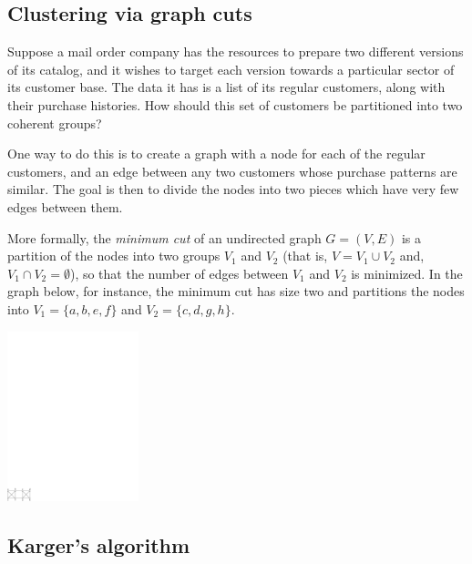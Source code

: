\documentclass{report}
\theoremstyle{plain}
\theoremstyle{definition}
\begin{document}
\lecturer{}
\scribe{}

\maketitle

\subsection{Clustering via graph cuts}

Suppose a mail order company has the resources to prepare two different versions of 
its catalog, and it wishes to target each version towards a particular sector of its 
customer base. The data it has is a list of its regular customers, along with their 
purchase histories. How should this set of customers be partitioned into two coherent 
groups?

One way to do this is to create a graph with a node for each of the regular customers,
and an edge between any two customers whose purchase patterns are similar. The goal is
then to divide the nodes into two pieces which have very few edges between them.

More formally, the {\it minimum cut} of an undirected graph $G = (V,E)$ is a partition
of the nodes into two groups $V_1$ and $V_2$ (that is, $V = V_1 \cup V_2$ and, 
$V_1 \cap V_2 = \emptyset$), so that the number of edges between $V_1$ and $V_2$ is
minimized. In the graph below, for instance, the minimum cut has size two and partitions
the nodes into $V_1 = \{a,b,e,f\}$ and $V_2 = \{c,d,g,h\}$.

\begin{center}
\includegraphics[width=1.5in]{figs/mincut.pdf}
\end{center}

\subsection{Karger's algorithm}
\end{document}
